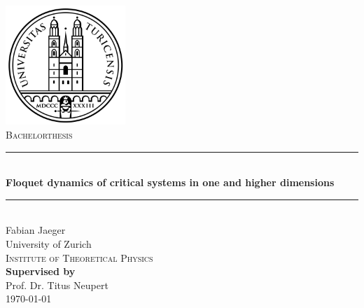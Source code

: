\documentclass[11pt, a4paper]{article}
\theoremstyle{definition} %
\begin{document}
\begin{titlepage}
    \centering
    \vspace*{0.5 cm}
    \includegraphics[width =0.34\textwidth]{UZH2.png}\\[1.2 cm]
      \textsc{\Large \textsc{Bachelorthesis}}\\[0.5 cm]

    \rule{\linewidth}{0.3 mm} \\[0.4cm]
    { \Large \bfseries Floquet dynamics of critical systems in one and higher dimensions}\\[0.3 cm]
    \rule{\linewidth}{0.3 mm} \\[1.5 cm]

  
    {\Large Fabian Jaeger}\\[2 cm] 
    
    
    		University of Zurich \\
             \textsc{Institute of Theoretical Physics} \\[1.5cm]
        
             	
    
    
    {\textbf{Supervised by}} \\[0.2cm]
   {\large  Prof. Dr. Titus Neupert} \\[2cm]
    
    {\large \today}\\[2 cm]
 
    \vfill
%    
    
\end{titlepage}
\end{document}
